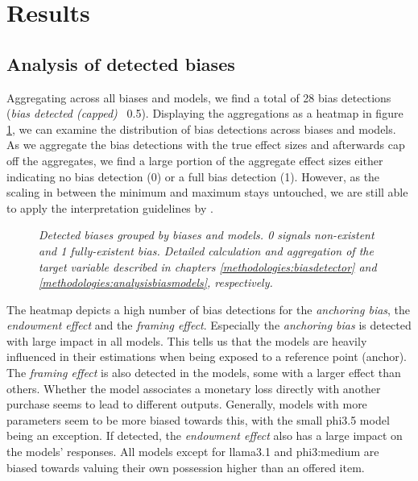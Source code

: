 \section{Results}
\label{chapter:results}

\subsection{Analysis of detected biases}
\par Aggregating across all biases and models, we find a total of 28 bias detections (\textit{bias detected (capped)} \geq\, 0.5). Displaying the aggregations as a heatmap in figure \ref{fig:detections-heatmap}, we can examine the distribution of bias detections across biases and models. As we aggregate the bias detections with the true effect sizes and afterwards cap off the aggregates, we find a large portion of the aggregate effect sizes either indicating no bias detection (0) or a full bias detection (1). However, as the scaling in between the minimum and maximum stays untouched, we are still able to apply the interpretation guidelines by \textcite{cohen1988statistical}.

\begin{figure}[htbp]
    \centering
    
    \caption[Heatmap of bias detections grouped by biases and models]{\centering \textit{Detected biases grouped by biases and models. 0 signals non-existent and 1 fully-existent bias. Detailed calculation and aggregation of the target variable described in chapters \ref{methodologies:biasdetector} and \ref{methodologies:analysisbiasmodels}, respectively.}}
    \label{fig:detections-heatmap}
\end{figure}

\par The heatmap depicts a high number of bias detections for the \textit{anchoring bias}, the \textit{endowment effect} and the \textit{framing effect}. Especially the \textit{anchoring bias} is detected with large impact in all models. This tells us that the models are heavily influenced in their estimations when being exposed to a reference point (anchor). The \textit{framing effect} is also detected in the models, some with a larger effect than others. Whether the model associates a monetary loss directly with another purchase seems to lead to different outputs. Generally, models with more parameters seem to be more biased towards this, with the small phi3.5 model being an exception. If detected, the \textit{endowment effect} also has a large impact on the models' responses. All models except for llama3.1 and phi3:medium are biased towards valuing their own possession higher than an offered item.

